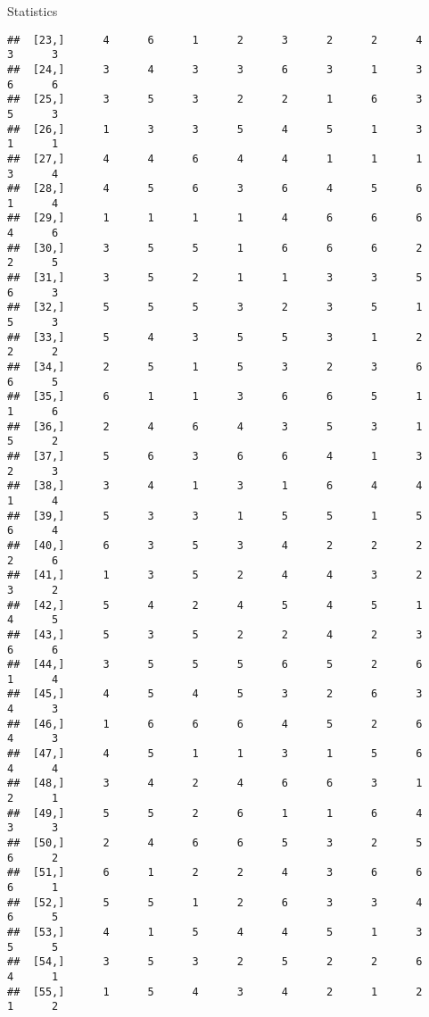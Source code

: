 \documentclass[
  ignorenonframetext,
]{beamer}
\begin{document}
\begin{frame}[fragile]{Statistics}
\begin{verbatim}
##  [23,]      4      6      1      2      3      2      2      4      3      3
##  [24,]      3      4      3      3      6      3      1      3      6      6
##  [25,]      3      5      3      2      2      1      6      3      5      3
##  [26,]      1      3      3      5      4      5      1      3      1      1
##  [27,]      4      4      6      4      4      1      1      1      3      4
##  [28,]      4      5      6      3      6      4      5      6      1      4
##  [29,]      1      1      1      1      4      6      6      6      4      6
##  [30,]      3      5      5      1      6      6      6      2      2      5
##  [31,]      3      5      2      1      1      3      3      5      6      3
##  [32,]      5      5      5      3      2      3      5      1      5      3
##  [33,]      5      4      3      5      5      3      1      2      2      2
##  [34,]      2      5      1      5      3      2      3      6      6      5
##  [35,]      6      1      1      3      6      6      5      1      1      6
##  [36,]      2      4      6      4      3      5      3      1      5      2
##  [37,]      5      6      3      6      6      4      1      3      2      3
##  [38,]      3      4      1      3      1      6      4      4      1      4
##  [39,]      5      3      3      1      5      5      1      5      6      4
##  [40,]      6      3      5      3      4      2      2      2      2      6
##  [41,]      1      3      5      2      4      4      3      2      3      2
##  [42,]      5      4      2      4      5      4      5      1      4      5
##  [43,]      5      3      5      2      2      4      2      3      6      6
##  [44,]      3      5      5      5      6      5      2      6      1      4
##  [45,]      4      5      4      5      3      2      6      3      4      3
##  [46,]      1      6      6      6      4      5      2      6      4      3
##  [47,]      4      5      1      1      3      1      5      6      4      4
##  [48,]      3      4      2      4      6      6      3      1      2      1
##  [49,]      5      5      2      6      1      1      6      4      3      3
##  [50,]      2      4      6      6      5      3      2      5      6      2
##  [51,]      6      1      2      2      4      3      6      6      6      1
##  [52,]      5      5      1      2      6      3      3      4      6      5
##  [53,]      4      1      5      4      4      5      1      3      5      5
##  [54,]      3      5      3      2      5      2      2      6      4      1
##  [55,]      1      5      4      3      4      2      1      2      1      2

\end{verbatim}
\end{frame}
\end{document}
